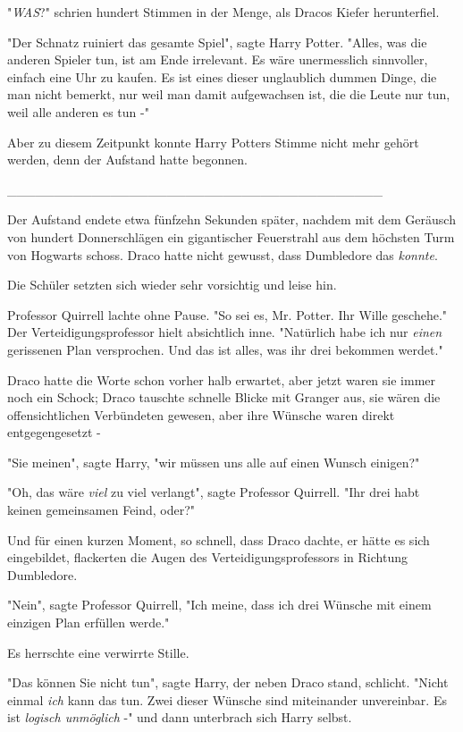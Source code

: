 {"\emph{WAS}?" schrien hundert Stimmen in der Menge, als Dracos Kiefer herunterfiel.

"Der Schnatz ruiniert das gesamte Spiel", sagte Harry Potter. "Alles, was die anderen Spieler tun, ist am Ende irrelevant. Es wäre unermesslich sinnvoller, einfach eine Uhr zu kaufen. Es ist eines dieser unglaublich dummen Dinge, die man nicht bemerkt, nur weil man damit aufgewachsen ist, die die Leute nur tun, weil alle anderen es tun -"

Aber zu diesem Zeitpunkt konnte Harry Potters Stimme nicht mehr gehört werden, denn der Aufstand hatte begonnen.

\_\_\_\_\_\_\_\_\_\_\_\_\_\_\_\_\_\_\_\_\_\_\_\_\_\_\_\_\_\_\_\_\_\_\_\_\_\_\_\_

Der Aufstand endete etwa fünfzehn Sekunden später, nachdem mit dem Geräusch von hundert Donnerschlägen ein gigantischer Feuerstrahl aus dem höchsten Turm von Hogwarts schoss. Draco hatte nicht gewusst, dass Dumbledore das \emph{konnte}.

Die Schüler setzten sich wieder sehr vorsichtig und leise hin.

Professor Quirrell lachte ohne Pause. "So sei es, Mr. Potter. Ihr Wille geschehe." Der Verteidigungsprofessor hielt absichtlich inne. "Natürlich habe ich nur \emph{einen} gerissenen Plan versprochen. Und das ist alles, was ihr drei bekommen werdet."

Draco hatte die Worte schon vorher halb erwartet, aber jetzt waren sie immer noch ein Schock; Draco tauschte schnelle Blicke mit Granger aus, sie wären die offensichtlichen Verbündeten gewesen, aber ihre Wünsche waren direkt entgegengesetzt -

"Sie meinen", sagte Harry, "wir müssen uns alle auf einen Wunsch einigen?"

"Oh, das wäre \emph{viel} zu viel verlangt", sagte Professor Quirrell. "Ihr drei habt keinen gemeinsamen Feind, oder?"

Und für einen kurzen Moment, so schnell, dass Draco dachte, er hätte es sich eingebildet, flackerten die Augen des Verteidigungsprofessors in Richtung Dumbledore.

"Nein", sagte Professor Quirrell, "Ich meine, dass ich drei Wünsche mit einem einzigen Plan erfüllen werde."

Es herrschte eine verwirrte Stille.

"Das können Sie nicht tun", sagte Harry, der neben Draco stand, schlicht. "Nicht einmal \emph{ich} kann das tun. Zwei dieser Wünsche sind miteinander unvereinbar. Es ist \emph{logisch unmöglich} -" und dann unterbrach sich Harry selbst.

}
